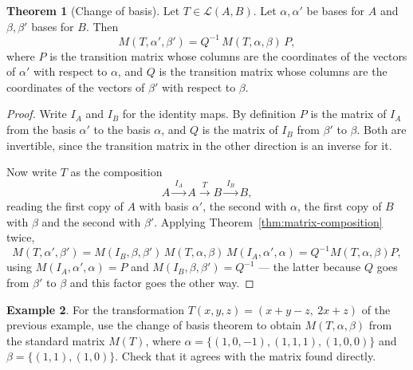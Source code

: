 \documentclass[11pt,a4paper]{article}
\theoremstyle{definition}
\newtheorem{thm}{Theorem}[subsection]
\newtheorem{exa}[thm]{Example}
\begin{document}
\begin{thm}[Change of basis]\label{thm:change-of-basis}
Let $T\in \mathcal{L}(A,B)$. Let $\alpha,\alpha'$ be bases for $A$ and
$\beta,\beta'$ bases for $B$. Then
$$M(T,\alpha',\beta')=Q^{-1}\,M(T,\alpha,\beta)\,P,$$
where $P$ is the transition matrix whose columns are the coordinates of the
vectors of $\alpha'$ with respect to $\alpha$, and $Q$ is the transition matrix
whose columns are the coordinates of the vectors of $\beta'$ with respect to
$\beta$.
\end{thm}

\begin{proof}
Write $I_A$ and $I_B$ for the identity maps. By definition $P$ is the matrix of
$I_A$ from the basis $\alpha'$ to the basis $\alpha$, and $Q$ is the matrix of
$I_B$ from $\beta'$ to $\beta$. Both are invertible, since the transition
matrix in the other direction is an inverse for it.

Now write $T$ as the composition
$$A \xrightarrow{\ I_A\ } A \xrightarrow{\ T\ } B \xrightarrow{\ I_B\ } B,$$
reading the first copy of $A$ with basis $\alpha'$, the second with $\alpha$,
the first copy of $B$ with $\beta$ and the second with $\beta'$. Applying
Theorem~\ref{thm:matrix-composition} twice,
$$M(T,\alpha',\beta')=M(I_B,\beta,\beta')\,M(T,\alpha,\beta)\,M(I_A,\alpha',\alpha)
= Q^{-1}M(T,\alpha,\beta)P,$$
using $M(I_A,\alpha',\alpha)=P$ and $M(I_B,\beta,\beta')=Q^{-1}$ --- the latter
because $Q$ goes from $\beta'$ to $\beta$ and this factor goes the other way.
\end{proof}

\begin{exa}
For the transformation $T(x,y,z)=(x+y-z,\ 2x+z)$ of the previous example, use
the change of basis theorem to obtain $M(T,\alpha,\beta)$ from the standard
matrix $M(T)$, where $\alpha=\{(1,0,-1),(1,1,1),(1,0,0)\}$ and
$\beta=\{(1,1),(1,0)\}$. Check that it agrees with the matrix found directly.
\end{exa}
\end{document}
